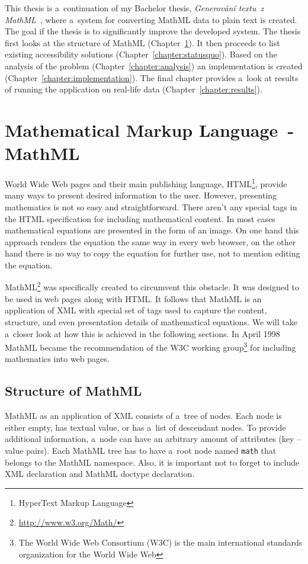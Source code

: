 \documentclass[11pt,oneside,final]{fithesis2}
\begin{document}
This thesis is a~continuation of my Bachelor thesis, \textit{Generování textu~z MathML}~\cite{Kucbel2011thesis}, where a~system for converting MathML data to plain text is created. The goal if the thesis is to significantly improve the developed system. The thesis first looks at the structure of MathML (Chapter~\ref{chapter:mathml}). It then proceeds to list existing accessibility solutions (Chapter~\ref{chapter:statusquo}). Based on the analysis of the problem (Chapter~\ref{chapter:analysis}) an implementation is created (Chapter~\ref{chapter:implementation}). The final chapter provides a~look at results of running the application on real-life data (Chapter~\ref{chapter:results}).

\chapter{Mathematical Markup Language~- MathML}
\label{chapter:mathml}
World Wide Web pages and their main publishing language, HTML\footnote{HyperText Markup Language}, provide many ways to present desired information to the user. However, presenting mathematics is not so easy and straightforward. There aren't any special tags in the HTML specification for including mathematical content. In most cases mathematical equations are presented in the form of an image. On one hand this approach renders the equation the same way in every web browser, on the other hand there is no way to copy the equation for further use, not to mention editing the equation. 

MathML\footnote{\url{http://www.w3.org/Math/}} was specifically created to circumvent this obstacle. It was designed to be used in web pages along with HTML. It follows that MathML is an application of XML with special set of tags used to capture the content, structure, and even presentation details of mathematical equations. We will take a~closer look at how this is achieved in the following sections. In April 1998 MathML became the recommendation of the W3C working group\footnote{The World Wide Web Consortium (W3C) is the main international standards organization for the World Wide Web} for including mathematics into web pages.

\section{Structure of MathML}
MathML as an application of XML consists of a~tree of nodes. Each node is either empty, has textual value, or has a~list of descendant nodes. To provide additional information, a~node can have an arbitrary amount of attributes (key – value pairs). Each MathML tree has to have a~root node named \texttt{math} that belongs to the MathML namespace. Also, it is important not to forget to include XML declaration and MathML doctype declaration. 
\end{document}
